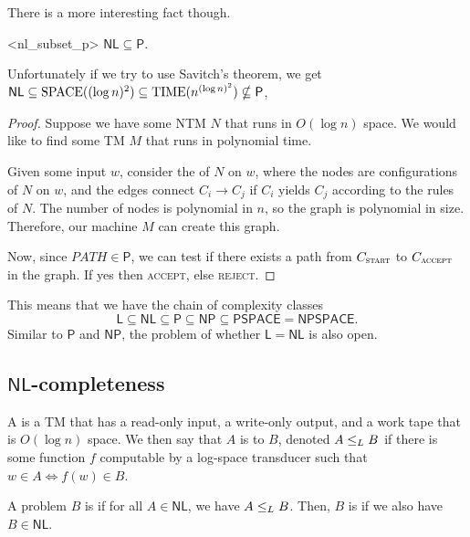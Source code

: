 \documentclass{standalone}
\begin{document}
There is a more interesting fact though.
\begin{proposition}<nl_subset_p>
  \(\mathsf{NL} \subseteq \mathsf{P}\).
\end{proposition}
Unfortunately if we try to use Savitch's theorem, we get \(\mathsf{NL} \subseteq \operatorname{SPACE}((\log n)^2) \subseteq \operatorname{TIME}(n^{(\log n)^2}) \nsubseteq \mathsf{P}\),
\begin{proof}
  Suppose we have some \textsf{NTM} \(N\) that runs in \(O(\log n)\) space. We would like to find some \textsf{TM} \(M\) that runs in polynomial time.

  Given some input \(w\), consider the  of \(N\) on \(w\), where the nodes are configurations of \(N\) on \(w\), and the edges connect \(C_i \to C_j\) if \(C_i\) yields \(C_j\) according to the rules of \(N\). The number of nodes is polynomial in \(n\), so the graph is polynomial in size. Therefore, our machine \(M\) can create this graph.

  Now, since \(\textit{PATH} \in \mathsf{P}\), we can test if there exists a path from \(C_{\textsc{start}}\) to \(C_{\textsc{accept}}\) in the graph. If yes then \textsc{accept}, else \textsc{reject}.
\end{proof}

This means that we have the chain of complexity classes
\[
  \mathsf{L} \subseteq \mathsf{NL} \subseteq \mathsf{P} \subseteq \mathsf{NP} \subseteq \mathsf{PSPACE} = \mathsf{NPSPACE}.
\]
Similar to \(\mathsf{P}\) and \(\mathsf{NP}\), the problem of whether \(\mathsf L = \mathsf{NL}\) is also open.

\subsection{\texorpdfstring{\(\mathsf{NL}\)}{NL}-completeness}
\begin{definition}
  A  is a \textsf{TM} that has a read-only input, a write-only output, and a work tape that is \(O(\log n)\) space. We then say that \(A\) is  to \(B\), denoted \(A \mathrel{\leq_L} B\) if there is some function \(f\) computable by a log-space transducer such that \(w \in A \iff f(w) \in B\).
\end{definition}

\begin{definition}
  A problem \(B\) is  if for all \(A \in \mathsf{NL}\), we have \(A \mathrel{\leq_L} B\). Then, \(B\) is  if we also have \(B \in \mathsf{NL}\).
\end{definition}
\end{document}
